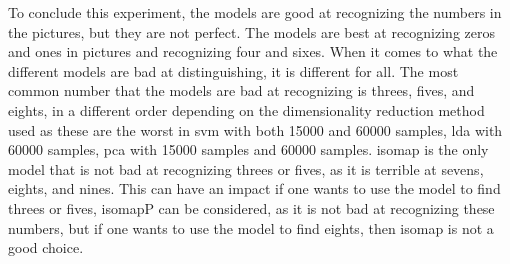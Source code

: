 To conclude this experiment, the models are good at recognizing the numbers in the pictures, but they are not perfect. The models are best at recognizing zeros and ones in pictures and recognizing four and sixes. When it comes to what the different models are bad at distinguishing, it is different for all. The most common number that the models are bad at recognizing is threes, fives, and eights, in a different order depending on the dimensionality reduction method used as these are the worst in \gls{svm} with both 15000 and 60000 samples, \gls{lda} with 60000 samples, \gls{pca} with 15000 samples and 60000 samples. \gls{isomap} is the only model that is not bad at recognizing threes or fives, as it is terrible at sevens, eights, and nines. This can have an impact if one wants to use the model to find threes or fives, \gls{isomap}P can be considered, as it is not bad at recognizing these numbers, but if one wants to use the model to find eights, then \gls{isomap} is not a good choice.

